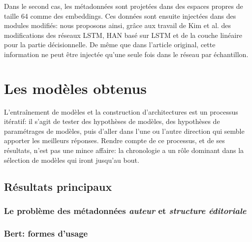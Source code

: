 Dans le second cas, les métadonnées sont projetées dans des espaces propres de taille 64 comme des embeddings. Ces données sont ensuite injectées dans des modules modifiés: nous proposons ainsi, grâce aux travail de Kim et al. des modifications des réseaux LSTM, HAN basé sur LSTM et de la couche linéaire pour la partie décisionnelle. De même que dans l'article original, cette information ne peut être injectée qu'une seule fois dans le réseau par échantillon.

\section{Les modèles obtenus}

L'entraînement de modèles et la construction d'architectures est un processus itératif: il s'agit de tester des hypothèses de modèles, des hypothèses de paramétrages de modèles, puis d'aller dans l'une ou l'autre direction qui semble apporter les meilleurs réponses. Rendre compte de ce processus, et de ses résultats, n'est pas une mince affaire: la chronologie a un rôle dominant dans la sélection de modèles qui iront jusqu'au bout.

\subsection{Résultats principaux}



\subsubsection{Le problème des métadonnées \textit{auteur} et \textit{structure éditoriale}}



\subsubsection{Bert: formes d'usage}


